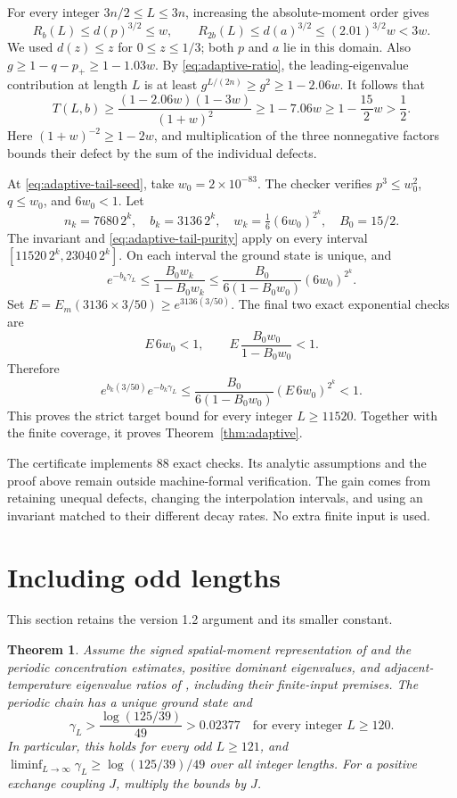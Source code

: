 \documentclass[11pt,a4paper]{article}
\newtheorem{theorem}{Theorem}
\newcommand{\gap}{\gamma}
\begin{document}
For every integer $3n/2\le L\le3n$, increasing the absolute-moment
order gives
\[
 R_b(L)\le d(p)^{3/2}\le w,\qquad
 R_{2b}(L)\le d(a)^{3/2}\le(2.01)^{3/2}w<3w.
\]
We used $d(z)\le z$ for $0\le z\le1/3$; both $p$ and $a$ lie in
this domain. Also $g\ge1-q-p_+\ge1-1.03w$. By
\eqref{eq:adaptive-ratio}, the leading-eigenvalue contribution at
length $L$ is at least $g^{L/(2n)}\ge g^2\ge1-2.06w$.
It follows that
\begin{equation}\label{eq:adaptive-tail-purity}
 T(L,b)\ge\frac{(1-2.06w)(1-3w)}{(1+w)^2}
 \ge1-7.06w\ge1-\frac{15}{2}w>\frac12.
\end{equation}
Here $(1+w)^{-2}\ge1-2w$, and multiplication of the three nonnegative
factors bounds their defect by the sum of the individual defects.

At \eqref{eq:adaptive-tail-seed}, take $w_0=2\times10^{-83}$.
The checker verifies $p^3\le w_0^2$, $q\le w_0$, and $6w_0<1$.
Let
\[
 n_k=7680\,2^k,\quad b_k=3136\,2^k,\quad
 w_k=\tfrac16(6w_0)^{2^k},\quad B_0=15/2.
\]
The invariant and \eqref{eq:adaptive-tail-purity} apply on every interval
$[11520\,2^k,23040\,2^k]$. On each interval the ground state is unique,
and
\[
 e^{-b_k\gap_L}\le\frac{B_0w_k}{1-B_0w_k}
 \le\frac{B_0}{6(1-B_0w_0)}(6w_0)^{2^k}.
\]
Set $E=E_m(3136\times3/50)\ge e^{3136(3/50)}$.
The final two exact exponential checks are
\[
 E\,6w_0<1,\qquad
 E\,\frac{B_0w_0}{1-B_0w_0}<1.
\]
Therefore
\[
 e^{b_k(3/50)}e^{-b_k\gap_L}
 \le\frac{B_0}{6(1-B_0w_0)}(E\,6w_0)^{2^k}<1.
\]
This proves the strict target bound for every integer $L\ge11520$.
Together with the finite coverage, it proves Theorem~\ref{thm:adaptive}.

The certificate  implements 88 exact
checks. Its analytic assumptions and the proof above remain outside
machine-formal verification. The gain comes from retaining unequal
defects, changing the interpolation intervals, and using an invariant
matched to their different decay rates. No extra finite input is used.

\section{Including odd lengths}
This section retains the version 1.2 argument and its smaller constant.
\begin{theorem}\label{thm:all-lengths}
Assume the signed spatial-moment representation of
\cite[Proposition 3.1]{upstream} and the periodic concentration estimates,
positive dominant eigenvalues, and adjacent-temperature eigenvalue ratios
of \cite[Proposition 3.4]{boundary}, including their finite-input premises.
The periodic chain has a unique ground state and
\[
 \boxed{\gap_L>\frac{\log(125/39)}{49}>0.02377
       \quad\text{for every integer }L\ge120.}
\]
In particular, this holds for every odd $L\ge121$, and
$\liminf_{L\to\infty}\gap_L\ge\log(125/39)/49$ over all integer lengths.
For a positive exchange coupling $J$, multiply the bounds by $J$.
\end{theorem}
\end{document}
